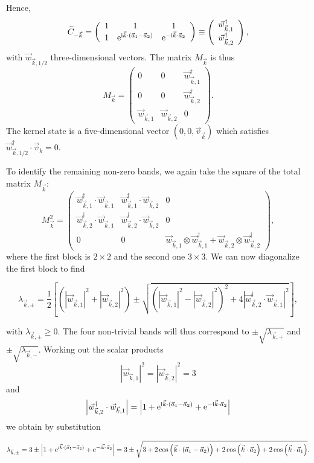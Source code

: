 \documentclass[prl,aps,twocolumn,showpacs,superscriptaddress,longbibliography]{revtex4-1}
\newcommand{\be}{\begin{equation}}
\newcommand{\ee}{\end{equation}}
\newcommand{\matb}{\left(\begin{array}}
\newcommand{\mate}{\end{array}\right)}
\newcommand{\rmi}{{\rm{i}}}
\newcommand{\rme}[1]{{\rm{e}}^{#1}}
\newcommand{\wt}{\widetilde}
\newcommand{\ha}{\frac{1}{2}}
\newcommand{\lt}{\left(}
\newcommand{\rt}{\right)}
\newcommand{\lqq}{\left[}
\newcommand{\rqq}{\right]}
\newcommand{\abs}[1]{\left| #1 \right|}
\newcommand{\cosa}[1]{\cos \left(  #1 \right)}
\begin{document}
Hence,
\be
	\wt{C}_{-\vec{k}} = \matb{ccc} 1 & 1  & 1 \\ 1 & \rme{\rmi\vec{k}\cdot (\vec{a}_1 - \vec{a}_2) } & \rme{- \rmi\vec{k} \cdot \vec{a}_2}      \mate \equiv \matb{c} \vec{w}_{\vec{k},1}^\dag \\ \vec{w}_{\vec{k},2}^\dag  \mate,
\ee
with $\vec{w}_{\vec{k},1/2}$ three-dimensional vectors. The matrix $M_{\vec{k}}$ is thus
\be
	M_{\vec{k}} = \matb{cc|c} 0 & 0 & \vec{w}_{\vec{k},1}^\dag  \\[1.5mm] 0 & 0 & \vec{w}_{\vec{k},2}^\dag  \\[1.5mm] \hline \vec{w}_{\vec{k},1} & \vec{w}_{\vec{k},2} & 0    \mate . 
\ee
The kernel state is a five-dimensional vector $(0,0,\vec{v}_{\vec{k}})$ which satisfies $\vec{w}_{\vec{k},1/2}^\dag \cdot \vec{v}_k = 0$.

To identify the remaining non-zero bands, we again take the square of the total matrix $M_{\vec{k}}$:
\be
	M_{\vec{k}}^2 = \matb{cc|c} \vec{w}_{\vec{k},1}^\dag \cdot \vec{w}_{\vec{k},1}  & \vec{w}_{\vec{k},1}^\dag \cdot \vec{w}_{\vec{k},2}  & 0  \\[1mm]
	\vec{w}_{\vec{k},2}^\dag \cdot \vec{w}_{\vec{k},1} & \vec{w}_{\vec{k},2}^\dag \cdot \vec{w}_{\vec{k},2} & 0   \\[1mm] \hline 
	0 & 0 & \vec{w}_{\vec{k},1} \otimes \vec{w}_{\vec{k},1}^\dag + \vec{w}_{\vec{k},2} \otimes \vec{w}_{\vec{k},2}^\dag
\mate ,
\ee
where the first block is $2\times 2$ and the second one $3\times 3$. We can now diagonalize the first block to find
\begin{widetext}
\be
	\lambda_{\vec{k},\pm} = \ha \lqq \lt \abs{\vec{w}_{\vec{k},1}}^2 + \abs{\vec{w}_{\vec{k},2}}^2  \rt \pm \sqrt{\lt    \abs{\vec{w}_{\vec{k},1}}^2  -  \abs{\vec{w}_{\vec{k},2}}^2  \rt^2  + 4\abs{\vec{w}_{\vec{k},2}^\dag \cdot \vec{w}_{\vec{k},1}}^2 }   \rqq,
\ee
\end{widetext}
with $\lambda_{\vec{k},\pm} \geq 0$. The four non-trivial bands will thus correspond to $\pm \sqrt{\lambda_{\vec{k},+}}$ and $\pm \sqrt{\lambda_{\vec{k},-}}$. Working out the scalar products
\be
	 \abs{\vec{w}_{\vec{k},1}}^2 = \abs{\vec{w}_{\vec{k},2}}^2 = 3 
\ee
and
\be
	\abs{\vec{w}_{\vec{k},2}^\dag \cdot \vec{w}_{\vec{k},1} } = \abs{1 + \rme{\rmi\vec{k}\cdot (\vec{a}_1 - \vec{a}_2) } + \rme{- \rmi\vec{k} \cdot \vec{a}_2}}
\ee
we obtain by substitution
\begin{widetext}
\be
\begin{split}
	\lambda_{\vec{k},\pm}  =  3\pm \abs{1 + \rme{\rmi\vec{k}\cdot (\vec{a}_1 - \vec{a}_2) } + \rme{- \rmi\vec{k} \cdot \vec{a}_2}}  
	 = 3 \pm \sqrt{3 + 2\cosa{\vec{k} \cdot (\vec{a}_1 - \vec{a}_2)} + 2\cosa{\vec{k} \cdot \vec{a}_2} + 2\cosa{\vec{k} \cdot \vec{a}_1}}.
\end{split}
\ee
\end{widetext}
\end{document}
